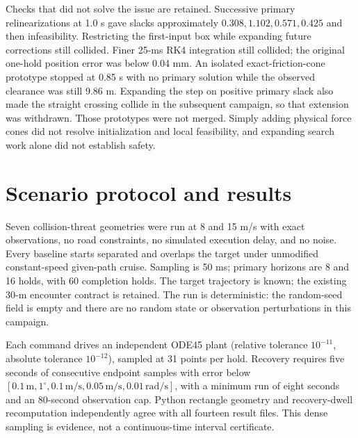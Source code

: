 \documentclass[11pt]{article}
\begin{document}
Checks that did not solve the issue are retained. Successive primary
relinearizations at 1.0 s gave slacks approximately
$0.308,1.102,0.571,0.425$ and then infeasibility. Restricting the first-input
box while expanding future corrections still collided. Finer 25-ms RK4
integration still collided; the original one-hold position error was below
0.04 mm. An isolated exact-friction-cone prototype stopped at 0.85 s with
no primary solution while the observed clearance was still 9.86 m. Expanding the step on positive primary slack also made the straight crossing collide in the subsequent campaign, so that extension was withdrawn. Those
prototypes were not merged. Simply adding physical force cones did not
resolve initialization and local feasibility, and expanding search work
alone did not establish safety.

\section{Scenario protocol and results}
Seven collision-threat geometries were run at 8 and 15 m/s with exact
observations, no road constraints, no simulated execution delay, and no noise.
Every baseline starts separated and overlaps the target under unmodified
constant-speed given-path cruise. Sampling is 50 ms; primary horizons are
8 and 16 holds, with 60 completion holds. The target trajectory is known;
the existing 30-m encounter contract is retained. The run is deterministic: the random-seed field is empty and there are no
random state or observation perturbations in this campaign.

Each command drives an independent ODE45 plant (relative tolerance
$10^{-11}$, absolute tolerance $10^{-12}$), sampled at 31 points per hold.
Recovery requires five seconds of consecutive endpoint samples with error below
$[0.1\,\mathrm m,1^\circ,0.1\,\mathrm{m/s},0.05\,\mathrm{m/s},
0.01\,\mathrm{rad/s}]$, with a minimum run of eight seconds and an
80-second observation cap. Python rectangle geometry and recovery-dwell
recomputation independently agree with all fourteen result files. This dense
sampling is evidence, not a continuous-time interval certificate.
\end{document}
